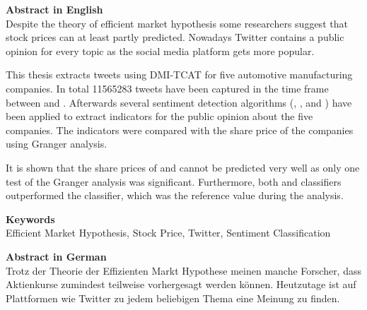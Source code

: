 
\newcommand*{\AbstractHead}[1]{%
{\noindent\color{header-blue}\Large\textbf{#1}}
\vspace{10pt}\\
}%

\newcommand*{\SomeSpace}{%
\vspace{\baselineskip}
}

\AbstractHead{Abstract in English}
\noindent
\normalsize
Despite the theory of efficient market hypothesis some researchers suggest that stock prices can at least partly predicted.
Nowadays Twitter contains a public opinion for every topic as the social media platform gets more popular.

This thesis extracts tweets using DMI-TCAT for five automotive manufacturing companies.
In total \num{11565283} tweets have been captured in the time frame between  and .
Afterwards several sentiment detection algorithms (\tb{}, \nb{}, \me{} and \svm{}) have been applied to extract indicators for the public opinion about the five companies.
The indicators were compared with the share price of the companies using Granger analysis.

It is shown that the share prices of \ford{} and \hyundai{} cannot be predicted very well as only one test of the Granger analysis was significant.
Furthermore, both \svm{} and \nb{} classifiers outperformed the \tb{} classifier, which was the reference value during the analysis.


\SomeSpace
\AbstractHead{Keywords}
\normalsize
\noindent
Efficient Market Hypothesis, Stock Price, Twitter, Sentiment Classification

\glsresetall
\SomeSpace

\AbstractHead{Abstract in German}
\noindent
\normalsize
Trotz der Theorie der Effizienten Markt Hypothese meinen manche Forscher, dass Aktienkurse zumindest teilweise vorhergesagt werden können.
Heutzutage ist auf Plattformen wie Twitter zu jedem beliebigen Thema eine Meinung zu finden.

